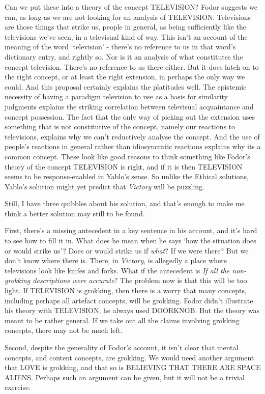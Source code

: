 \documentclass[
  10pt,
  letterpaper,
  DIV=11,
  numbers=noendperiod,
  twoside]{scrartcl}
\begin{document}
Can we put these into a theory of the concept TELEVISION? Fodor suggests
we can, as long as we are not looking for an analysis of TELEVISION.
Televisions are those things that strike us, people in general, as being
sufficiently like the televisions we've seen, in a televisual kind of
way. This isn't an account of the meaning of the word `television' -
there's no reference to us in that word's dictionary entry, and rightly
so. Nor is it an analysis of what constitutes the concept television.
There's no reference to us there either. But it does latch on to the
right concept, or at least the right extension, in perhaps the only way
we could. And this proposal certainly explains the platitudes well. The
epistemic necessity of having a paradigm television to use as a basis
for similarity judgments explains the striking correlation between
televisual acquaintance and concept possession. The fact that the only
way of picking out the extension uses something that is not constitutive
of the concept, namely our reactions to televisions, explains why we
can't reductively analyse the concept. And the use of people's reactions
in general rather than idiosyncratic reactions explains why its a common
concept. These look like good reasons to think something like Fodor's
theory of the concept TELEVISION is right, and if it is then TELEVISION
seems to be response-enabled in Yablo's sense. So unlike the Ethical
solutions, Yablo's solution might yet predict that \emph{Victory} will
be puzzling.

Still, I have three quibbles about his solution, and that's enough to
make me think a better solution may still to be found.

First, there's a missing antecedent in a key sentence in his account,
and it's hard to see how to fill it in. What does he mean when he says
`how the situation does or would strike us'? Does or would strike us if
\emph{what}? If we were there? But we don't know where there is. There,
in \emph{Victory}, is allegedly a place where televisions look like
knifes and forks. What if the antecedent is \emph{If all the
non-grokking descriptions were accurate}? The problem now is that this
will be too light. If TELEVISION is grokking, then there is a worry that
many concepts, including perhaps all artefact concepts, will be
grokking. Fodor didn't illustrate his theory with TELEVISION, he always
used DOORKNOB. But the theory was meant to be rather general. If we take
out all the claims involving grokking concepts, there may not be much
left.

Second, despite the generality of Fodor's account, it isn't clear that
mental concepts, and content concepts, are grokking. We would need
another argument that LOVE is grokking, and that so is BELIEVING THAT
THERE ARE SPACE ALIENS. Perhaps such an argument can be given, but it
will not be a trivial exercise.
\end{document}
